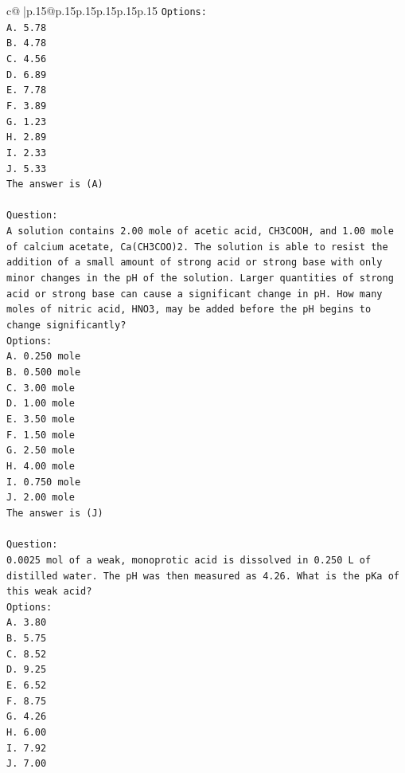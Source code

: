 \documentclass{article}
\begin{document}
{\begin{supertabular}{c@{$\;$}|p{.15\linewidth}@{}p{.15\linewidth}p{.15\linewidth}p{.15\linewidth}p{.15\linewidth}p{.15\linewidth}}
{{{\texttt{Options:} \\
\texttt{A. 5.78} \\
\texttt{B. 4.78} \\
\texttt{C. 4.56} \\
\texttt{D. 6.89} \\
\texttt{E. 7.78} \\
\texttt{F. 3.89} \\
\texttt{G. 1.23} \\
\texttt{H. 2.89} \\
\texttt{I. 2.33} \\
\texttt{J. 5.33} \\
\texttt{The answer is (A)} \\
\\ 
\texttt{Question:} \\
\texttt{A solution contains 2.00 mole of acetic acid, CH3COOH, and 1.00 mole of calcium acetate, Ca(CH3COO)2. The solution is able to resist the addition of a small amount of strong acid or strong base with only minor changes in the pH of the solution. Larger quantities of strong acid or strong base can cause a significant change in pH. How many moles of nitric acid, HNO3, may be added before the pH begins to change significantly?} \\
\texttt{Options:} \\
\texttt{A. 0.250 mole} \\
\texttt{B. 0.500 mole} \\
\texttt{C. 3.00 mole} \\
\texttt{D. 1.00 mole} \\
\texttt{E. 3.50 mole} \\
\texttt{F. 1.50 mole} \\
\texttt{G. 2.50 mole} \\
\texttt{H. 4.00 mole} \\
\texttt{I. 0.750 mole} \\
\texttt{J. 2.00 mole} \\
\texttt{The answer is (J)} \\
\\ 
\texttt{Question:} \\
\texttt{0.0025 mol of a weak, monoprotic acid is dissolved in 0.250 L of distilled water. The pH was then measured as 4.26. What is the pKa of this weak acid?} \\
\texttt{Options:} \\
\texttt{A. 3.80} \\
\texttt{B. 5.75} \\
\texttt{C. 8.52} \\
\texttt{D. 9.25} \\
\texttt{E. 6.52} \\
\texttt{F. 8.75} \\
\texttt{G. 4.26} \\
\texttt{H. 6.00} \\
\texttt{I. 7.92} \\
\texttt{J. 7.00} \\
            }
        }
    }
     \\ \\


\end{supertabular}}
\end{document}
